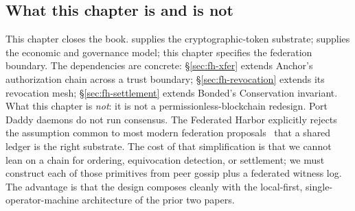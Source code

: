 \documentclass[11pt,a4paper]{article}
\theoremstyle{definition}
\theoremstyle{remark}
\begin{document}
\subsection{What this chapter is and is not}\label{sec:fh-scope}
This chapter closes the book.  supplies the cryptographic-token substrate;  supplies the economic and governance model; this chapter specifies the federation boundary. The dependencies are concrete: \S\ref{sec:fh-xfer} extends Anchor's authorization chain across a trust boundary; \S\ref{sec:fh-revocation} extends its revocation mesh; \S\ref{sec:fh-settlement} extends Bonded's Conservation invariant.
What this chapter is \emph{not}: it is not a permissionless-blockchain redesign. Port Daddy daemons do not run consensus. The Federated Harbor explicitly rejects the assumption common to most modern federation proposals~ that a shared ledger is the right substrate. The cost of that simplification is that we cannot lean on a chain for ordering, equivocation detection, or settlement; we must construct each of those primitives from peer gossip plus a federated witness log. The advantage is that the design composes cleanly with the local-first, single-operator-machine architecture of the prior two papers.
\end{document}
